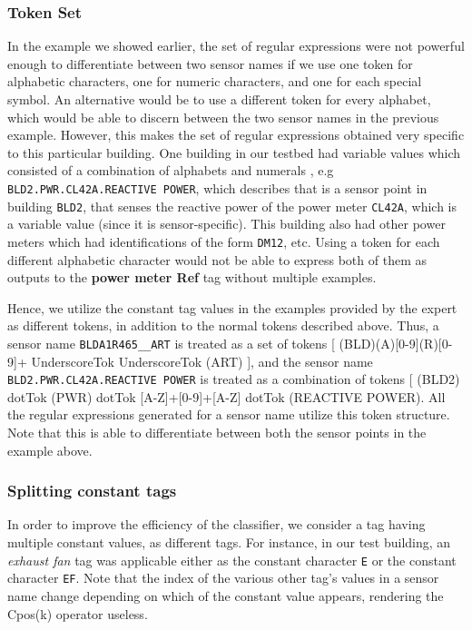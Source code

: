 \subsubsection{Token Set}

In the example we showed earlier, the set of regular expressions were not powerful enough to differentiate between two sensor names if we use one token for alphabetic characters, one for numeric characters, and one for each special symbol. An alternative would be to use a different token for every alphabet, which would be able to discern between the two sensor names in the previous example. However, this makes the set of regular expressions obtained very specific to this particular building. One building in our testbed had variable values which consisted of a combination of alphabets and numerals , e.g \texttt{BLD2.PWR.CL42A.REACTIVE POWER}, which describes that is a sensor point in building \texttt{BLD2}, that senses the reactive power of the power meter \texttt{CL42A}, which is a variable value (since it is sensor-specific). This building also had other power meters which had identifications of the form \texttt{DM12}, etc. Using a token for each different alphabetic character would not be able to express both of them as outputs to the {\bf power meter Ref} tag without multiple examples.

Hence, we utilize the constant tag values in the examples provided by the expert as different tokens, in addition to the normal tokens described above. Thus, a sensor name \texttt{BLDA1R465\_\_ART} is treated as a set of tokens [ (BLD)(A)[0-9](R)[0-9]+ UnderscoreTok UnderscoreTok (ART) ], and the sensor name \texttt{BLD2.PWR.CL42A.REACTIVE POWER} is treated as a combination of tokens [ (BLD2) dotTok (PWR) dotTok [A-Z]+[0-9]+[A-Z] dotTok (REACTIVE POWER). All the regular expressions generated for a sensor name utilize this token structure. Note that this is able to differentiate between both the sensor points in the example above. 

\subsubsection{Splitting constant tags}

In order to improve the efficiency of the classifier, we consider a tag having multiple constant values, as different tags. For instance, in our test building, an {\it exhaust fan} tag was applicable either as the constant character \texttt{E} or the constant character \texttt{EF}. Note that the index of the various other tag's values in a sensor name change depending on which of the constant value appears, rendering the Cpos(k) operator useless. 

